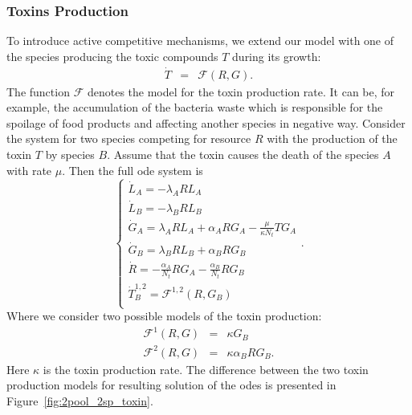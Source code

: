 \documentclass[10pt,A4paper]{article}
\numberwithin{equation}{section}
\begin{document}
\subsubsection{Toxins Production}
To introduce active competitive mechanisms, we extend our model with one of the species producing the toxic compounds $T$ during its growth:
\begin{eqnarray}
    \dot{T} &=& \mathcal{F}(R,G).
\end{eqnarray}
The function $\mathcal{F}$ denotes the model for the toxin production rate.
It can be, for example, the accumulation of the bacteria waste which is responsible for the spoilage of food products and affecting another species in negative way.
Consider the system for two species competing for resource $R$ with the production of the toxin $T$ by species $B$.
Assume that the toxin causes the death of the species $A$ with rate $\mu$.
Then the full \ac{ode} system is
\begin{equation}
    \begin{cases}
        \dot{L}_A = - \lambda_A R L_A\\
        \dot{L}_B = - \lambda_B R L_B \\
        \dot{G}_A = \lambda_A R L_A + \alpha_A R G_A - \frac{\mu}{\kappa N_t} T G_A\\
        \dot{G}_B = \lambda_B R L_B + \alpha_B R G_B\\ 
        \dot{R} = -\frac{\alpha_A}{N_t} R G_A-\frac{\alpha_B}{N_t} R G_B\\
        \dot{T}_{B}^{1,2} = \mathcal{F}^{1,2} (R, G_B) \\
    \end{cases}.
    \label{eq:model_2sp_toxin}
\end{equation}
%
Where we consider two possible models of the toxin production:
\begin{eqnarray}
    \mathcal{F}^1(R,G)&=&\kappa G_B\\
    \mathcal{F}^2(R,G)&=&\kappa\alpha_B R G_B.
\end{eqnarray}
Here $\kappa$ is the toxin production rate.
The difference between the two toxin production models for resulting solution of the \acp{ode} is presented in Figure~\ref{fig:2pool_2sp_toxin}.
%
%
\end{document}
